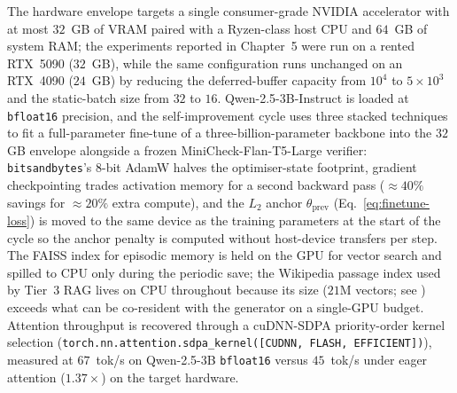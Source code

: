 The hardware envelope targets a single consumer-grade NVIDIA accelerator with at most $32$~GB of VRAM paired with a Ryzen-class host CPU and $64$~GB of system RAM; the experiments reported in Chapter~5 were run on a rented RTX~5090 ($32$~GB), while the same configuration runs unchanged on an RTX~4090 ($24$~GB) by reducing the deferred-buffer capacity from $10^{4}$ to $5 \times 10^{3}$ and the static-batch size from $32$ to $16$. Qwen-2.5-3B-Instruct is loaded at \texttt{bfloat16} precision, and the self-improvement cycle uses three stacked techniques to fit a full-parameter fine-tune of a three-billion-parameter backbone into the $32$\,GB envelope alongside a frozen MiniCheck-Flan-T5-Large verifier: \texttt{bitsandbytes}'s 8-bit AdamW halves the optimiser-state footprint, gradient checkpointing trades activation memory for a second backward pass ($\approx 40\%$ savings for $\approx 20\%$ extra compute), and the $L_{2}$ anchor $\theta_{\text{prev}}$ (Eq.~\ref{eq:finetune-loss}) is moved to the same device as the training parameters at the start of the cycle so the anchor penalty is computed without host-device transfers per step. The FAISS index for episodic memory is held on the GPU for vector search and spilled to CPU only during the periodic save; the Wikipedia passage index used by Tier~3 RAG lives on CPU throughout because its size ($21$M vectors; see ) exceeds what can be co-resident with the generator on a single-GPU budget. Attention throughput is recovered through a cuDNN-SDPA priority-order kernel selection (\texttt{torch.nn.attention.sdpa\_kernel([CUDNN, FLASH, EFFICIENT])}), measured at $67$~tok/s on Qwen-2.5-3B \texttt{bfloat16} versus $45$~tok/s under eager attention ($1.37\times$) on the target hardware.

